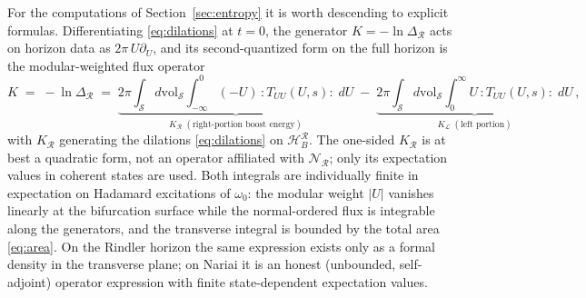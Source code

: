 \documentclass[11pt]{article}
\newcommand{\Nariai}{Nariai}
\begin{document}
For the computations of Section~\ref{sec:entropy} it is worth descending to explicit formulas. Differentiating \eqref{eq:dilations} at $t=0$, the generator $K = -\ln \Delta_{\mathcal{R}}$ acts on horizon data as $2\pi\, U \partial_U$, and its second-quantized form on the full horizon is the modular-weighted flux operator
\begin{equation}
K \;=\; -\ln \Delta_{\mathcal{R}}
\;=\; \underbrace{2\pi \int_{\mathcal{S}} d\mathrm{vol}_{\mathcal{S}} \int_{-\infty}^{0} (-U)\, {:}T_{UU}(U,s){:}\; dU}_{\displaystyle K_{\mathcal{R}}\;(\text{right-portion boost energy})}
\;-\;
\underbrace{2\pi \int_{\mathcal{S}} d\mathrm{vol}_{\mathcal{S}} \int_{0}^{\infty} U\, {:}T_{UU}(U,s){:}\; dU}_{\displaystyle K_{\mathcal{L}}\;(\text{left portion})}\,,
\label{eq:modularH}
\end{equation}
with $K_{\mathcal{R}}$ generating the dilations \eqref{eq:dilations} on $\mathcal{H}_B^{\mathcal{R}}$. The one-sided $K_{\mathcal R}$ is at best a quadratic form, not an operator affiliated with $\mathscr N_{\mathcal R}$; only its expectation values in coherent states are used. Both integrals are individually finite in expectation on Hadamard excitations of $\omega_0$: the modular weight $|U|$ vanishes linearly at the bifurcation surface while the normal-ordered flux is integrable along the generators, and the transverse integral is bounded by the total area \eqref{eq:area}. On the Rindler horizon the same expression exists only as a formal density in the transverse plane; on \Nariai{} it is an honest (unbounded, self-adjoint) operator expression with finite state-dependent expectation values.
\end{document}
